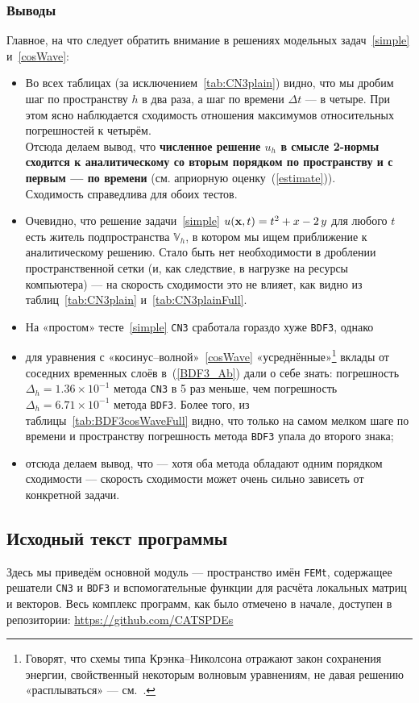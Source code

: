 \subsubsection{Выводы}

Главное, на что следует обратить внимание в решениях модельных задач~\ref{simple} и~\ref{cosWave}:
\begin{itemize}
	\item Во всех таблицах (за исключением~\ref{tab:CN3plain}) видно, что мы дробим шаг по пространству $h$ в два раза, а шаг по времени $\Delta t$ --- в четыре. При этом ясно наблюдается сходимость отношения максимумов относительных погрешностей к четырём.\\
	Отсюда делаем вывод, что \textbf{численное решение $u_h$ в смысле 2-нормы сходится к аналитическому со вторым порядком по пространству и с первым --- по времени} (см. априорную оценку~(\ref{estimate})).\\
	Сходимость справедлива для обоих тестов.
	\item Очевидно, что решение задачи~\ref{simple} $u(\boldsymbol{\mathbf{x}}, t) = t^2 + x - 2 \, y$ для любого $t$ есть житель подпространства $\mathbb{V}_h$, в котором мы ищем приближение к аналитическому решению. Стало быть нет необходимости в дроблении пространственной сетки (и, как следствие, в нагрузке на ресурсы компьютера) --- на скорость сходимости это не влияет, как видно из таблиц~\ref{tab:CN3plain} и~\ref{tab:CN3plainFull}.
	\item На «простом» тесте~\ref{simple} \texttt{CN3} сработала гораздо хуже \texttt{BDF3}, однако
	\item для уравнения с «косинус--волной»~\ref{cosWave} «усреднённые»\footnote{
			Говорят, что схемы типа Крэнка--Николсона отражают закон сохранения энергии, свойственный некоторым волновым уравнениям, не давая решению «расплываться» --- см.~\cite[с.~137]{umea}.
		} вклады от соседних временных слоёв в~(\ref{BDF3_Ab}) дали о себе знать: погрешность $\Delta_h = 1.36 \times 10^{-1}$ метода \texttt{CN3} в 5 раз меньше, чем погрешность $\Delta_h = 6.71 \times 10^{-1}$ метода \texttt{BDF3}. Более того, из таблицы~\ref{tab:BDF3cosWaveFull} видно, что только на самом мелком шаге по времени и пространству погрешность метода \texttt{BDF3} упала до второго знака;
	\item отсюда делаем вывод, что --- хотя оба метода обладают одним порядком сходимости --- скорость сходимости может очень сильно зависеть от конкретной задачи. 
\end{itemize}

\newpage
\subsection{Исходный текст программы}

Здесь мы приведём основной модуль --- пространство имён \texttt{FEMt}, содержащее решатели \texttt{CN3} и \texttt{BDF3} и вспомогательные функции для расчёта локальных матриц и векторов. Весь комплекс программ, как было отмечено в начале, доступен в репозитории:
\url{https://github.com/CATSPDEs} \\


